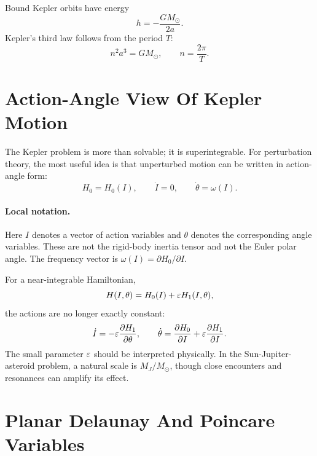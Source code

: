 Bound Kepler orbits have energy
\[
  h=-\frac{GM_\odot}{2a}.
\]
Kepler's third law follows from the period \(T\):
\[
  n^2a^3=GM_\odot,\qquad n=\frac{2\pi}{T}.
\]

\section{Action-Angle View Of Kepler Motion}
\label{sec:kepler-action-angle}

The Kepler problem is more than solvable; it is superintegrable. For
perturbation theory, the most useful idea is that unperturbed motion can be
written in action-angle form:
\[
  H_0=H_0(I),
  \qquad
  \dot I=0,
  \qquad
  \dot\theta=\omega(I).
\]

\paragraph{Local notation.}
Here \(I\) denotes a vector of action variables and \(\theta\) denotes the
corresponding angle variables.  These are not the rigid-body inertia tensor and
not the Euler polar angle.  The frequency vector is
\(\omega(I)=\partial H_0/\partial I\).

For a near-integrable Hamiltonian,
\[
  H(I,\theta)=H_0(I)+\varepsilon H_1(I,\theta),
\]
the actions are no longer exactly constant:
\[
  \dot I=-\varepsilon\frac{\partial H_1}{\partial \theta},
  \qquad
  \dot\theta=\frac{\partial H_0}{\partial I}
  +
  \varepsilon\frac{\partial H_1}{\partial I}.
\]
The small parameter \(\varepsilon\) should be interpreted physically. In the
Sun-Jupiter-asteroid problem, a natural scale is \(M_J/M_\odot\), though close
encounters and resonances can amplify its effect.

\section{Planar Delaunay And Poincare Variables}
\label{sec:planar-delaunay-poincare}

